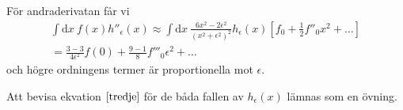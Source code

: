 \documentclass[reprint,
 amsmath,amssymb,
 aps,prl
]{revtex4-1}
\begin{document}
För andraderivatan får vi
\begin{gather}
    \int\mathrm dx\ f(x)h''_\epsilon(x)\approx\int\mathrm dx\ \frac{6x^2-2\epsilon^2}{\left(x^2+\epsilon^2\right)^2}h_\epsilon(x)\left[f_0+\frac12f''_0x^2+\ldots\right] \nonumber\\
    =\frac{3-3}{4\epsilon^2}f(0)+\frac{9-1}8f'''_0\epsilon^2+\ldots
\end{gather}
och högre ordningens termer är proportionella mot $\epsilon$.

Att bevisa ekvation $\eqref{tredje}$ för de båda fallen av $h_\epsilon(x)$ lämnas som en övning.
\end{document}
